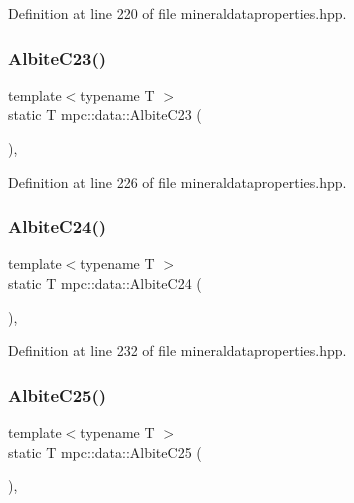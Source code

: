 Definition at line 220 of file mineraldataproperties.\+hpp.

\mbox{\label{namespacempc_1_1data_abeca06431a6de76784fe30e5e98670ea}} 
\subsubsection{\texorpdfstring{Albite\+C23()}{AlbiteC23()}}
{\footnotesize\ttfamily template$<$typename T $>$ \\
static T mpc\+::data\+::\+Albite\+C23 (\begin{DoxyParamCaption}{ }\end{DoxyParamCaption})\hspace{0.3cm}{\ttfamily [inline]}, {\ttfamily [static]}}



Definition at line 226 of file mineraldataproperties.\+hpp.

\mbox{\label{namespacempc_1_1data_a8148f7f86d37e36281e0d0f2af939552}} 
\subsubsection{\texorpdfstring{Albite\+C24()}{AlbiteC24()}}
{\footnotesize\ttfamily template$<$typename T $>$ \\
static T mpc\+::data\+::\+Albite\+C24 (\begin{DoxyParamCaption}{ }\end{DoxyParamCaption})\hspace{0.3cm}{\ttfamily [inline]}, {\ttfamily [static]}}



Definition at line 232 of file mineraldataproperties.\+hpp.

\mbox{\label{namespacempc_1_1data_add0dcc11706dee896b0fba677f4b7ba6}} 
\subsubsection{\texorpdfstring{Albite\+C25()}{AlbiteC25()}}
{\footnotesize\ttfamily template$<$typename T $>$ \\
static T mpc\+::data\+::\+Albite\+C25 (\begin{DoxyParamCaption}{ }\end{DoxyParamCaption})\hspace{0.3cm}{\ttfamily [inline]}, {\ttfamily [static]}}



